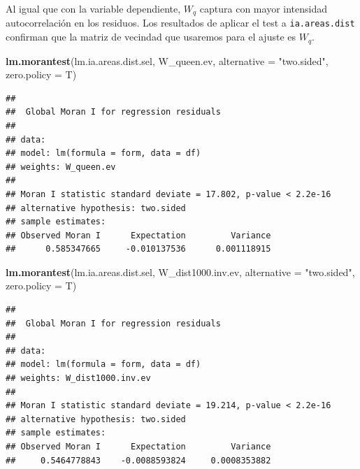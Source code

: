 \documentclass[12pt,]{book}
\newenvironment{Shaded}{\begin{snugshade}}{\end{snugshade}}
\newcommand{\KeywordTok}[1]{\textcolor[rgb]{0.13,0.29,0.53}{\textbf{#1}}}
\newcommand{\DataTypeTok}[1]{\textcolor[rgb]{0.13,0.29,0.53}{#1}}
\newcommand{\StringTok}[1]{\textcolor[rgb]{0.31,0.60,0.02}{#1}}
\newcommand{\NormalTok}[1]{#1}
\begin{document}
Al igual que con la variable dependiente, \(W_q\) captura con mayor
intensidad autocorrelación en los residuos. Los resultados de aplicar el
test a \texttt{ia.areas.dist} confirman que la matriz de vecindad que
usaremos para el ajuste es \(W_q\).

\begin{Shaded}
\begin{Highlighting}[]
\KeywordTok{lm.morantest}\NormalTok{(lm.ia.areas.dist.sel, W_queen.ev, }\DataTypeTok{alternative =} \StringTok{"two.sided"}\NormalTok{, }\DataTypeTok{zero.policy =}\NormalTok{ T)}
\end{Highlighting}
\end{Shaded}

\begin{verbatim}
## 
##  Global Moran I for regression residuals
## 
## data:  
## model: lm(formula = form, data = df)
## weights: W_queen.ev
## 
## Moran I statistic standard deviate = 17.802, p-value < 2.2e-16
## alternative hypothesis: two.sided
## sample estimates:
## Observed Moran I      Expectation         Variance 
##      0.585347665     -0.010137536      0.001118915
\end{verbatim}

\begin{Shaded}
\begin{Highlighting}[]
\KeywordTok{lm.morantest}\NormalTok{(lm.ia.areas.dist.sel, W_dist1000.inv.ev, }\DataTypeTok{alternative =} \StringTok{"two.sided"}\NormalTok{, }
    \DataTypeTok{zero.policy =}\NormalTok{ T)}
\end{Highlighting}
\end{Shaded}

\begin{verbatim}
## 
##  Global Moran I for regression residuals
## 
## data:  
## model: lm(formula = form, data = df)
## weights: W_dist1000.inv.ev
## 
## Moran I statistic standard deviate = 19.214, p-value < 2.2e-16
## alternative hypothesis: two.sided
## sample estimates:
## Observed Moran I      Expectation         Variance 
##     0.5464778843    -0.0088593824     0.0008353882
\end{verbatim}
\end{document}
